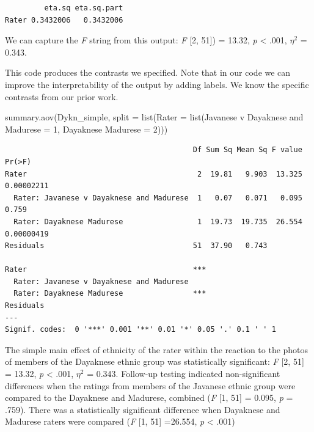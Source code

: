 \documentclass[
  11pt,
]{book}
\newenvironment{Shaded}{\begin{snugshade}}{\end{snugshade}}
\newcommand{\AttributeTok}[1]{\textcolor[rgb]{0.77,0.63,0.00}{#1}}
\newcommand{\DecValTok}[1]{\textcolor[rgb]{0.00,0.00,0.81}{#1}}
\newcommand{\FunctionTok}[1]{\textcolor[rgb]{0.00,0.00,0.00}{#1}}
\newcommand{\NormalTok}[1]{#1}
\newcommand{\OtherTok}[1]{\textcolor[rgb]{0.56,0.35,0.01}{#1}}
\newcommand{\StringTok}[1]{\textcolor[rgb]{0.31,0.60,0.02}{#1}}
\begin{document}
\begin{verbatim}
         eta.sq eta.sq.part
Rater 0.3432006   0.3432006
\end{verbatim}

We can capture the \emph{F} string from this output: \emph{F} {[}2, 51{]}) = 13.32, \emph{p} \textless{} .001, \(\eta ^{2}\) = 0.343.

This code produces the contrasts we specified. Note that in our code we can improve the interpretability of the output by adding labels. We know the specific contrasts from our prior work.

\begin{Shaded}
\begin{Highlighting}[]
\FunctionTok{summary.aov}\NormalTok{(Dykn\_simple, }\AttributeTok{split =} \FunctionTok{list}\NormalTok{(}\AttributeTok{Rater =} \FunctionTok{list}\NormalTok{(}\StringTok{\textasciigrave{}}\AttributeTok{Javanese v Dayaknese and Madurese}\StringTok{\textasciigrave{}} \OtherTok{=} \DecValTok{1}\NormalTok{,}
    \StringTok{\textasciigrave{}}\AttributeTok{Dayaknese Madurese}\StringTok{\textasciigrave{}} \OtherTok{=} \DecValTok{2}\NormalTok{)))}
\end{Highlighting}
\end{Shaded}

\begin{verbatim}
                                           Df Sum Sq Mean Sq F value     Pr(>F)
Rater                                       2  19.81   9.903  13.325 0.00002211
  Rater: Javanese v Dayaknese and Madurese  1   0.07   0.071   0.095      0.759
  Rater: Dayaknese Madurese                 1  19.73  19.735  26.554 0.00000419
Residuals                                  51  37.90   0.743                   
                                              
Rater                                      ***
  Rater: Javanese v Dayaknese and Madurese    
  Rater: Dayaknese Madurese                ***
Residuals                                     
---
Signif. codes:  0 '***' 0.001 '**' 0.01 '*' 0.05 '.' 0.1 ' ' 1
\end{verbatim}

The simple main effect of ethnicity of the rater within the reaction to the photos of members of the Dayaknese ethnic group was statistically significant: \emph{F} {[}2, 51{]} = 13.32, \emph{p} \textless{} .001, \(\eta ^{2}\) = 0.343. Follow-up testing indicated non-significant differences when the ratings from members of the Javanese ethnic group were compared to the Dayaknese and Madurese, combined (\emph{F} {[}1, 51{]} = 0.095, \emph{p} = .759). There was a statistically significant difference when Dayaknese and Madurese raters were compared (\emph{F} {[}1, 51{]} =26.554, \emph{p} \textless{} .001)
\end{document}
